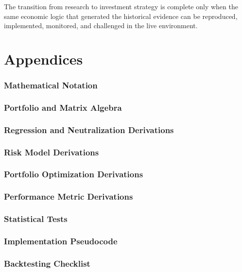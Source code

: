 \documentclass[11pt,a4paper]{article}
\begin{document}
The transition from research to investment strategy is complete only when the
same economic logic that generated the historical evidence can be reproduced,
implemented, monitored, and challenged in the live environment.

\appendix
\part{Appendices}

\section{Mathematical Notation}

\section{Portfolio and Matrix Algebra}

\section{Regression and Neutralization Derivations}

\section{Risk Model Derivations}

\section{Portfolio Optimization Derivations}

\section{Performance Metric Derivations}

\section{Statistical Tests}

\section{Implementation Pseudocode}

\section{Backtesting Checklist}


\end{document}
